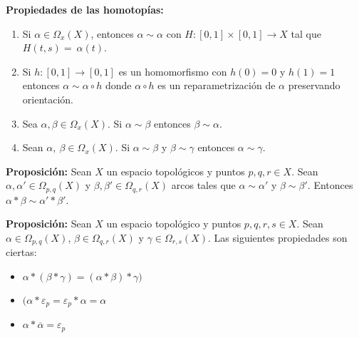 \documentclass{article}
\begin{document}
\textbf{Propiedades de las homotopías:}
\begin{enumerate}
\item Si $\alpha\in \Omega_x(X)$, entonces $\alpha\sim \alpha$ con $H:[0,1]\times [0,1]\rightarrow X$ tal que $H(t,s)=~\alpha(t)$.

\item Si $h:[0,1]\rightarrow [0,1]$ es un homomorfismo con $h(0)=0$ y $h(1)=1$ entonces $\alpha\sim \alpha\circ h$ donde $\alpha \circ h$ es un reparametrización de $\alpha$ preservando orientación.

\item Sea $\alpha,\beta \in \Omega_x(X)$. Si $\alpha\sim \beta$ entonces $\beta \sim \alpha$.

\item Sean $\alpha,\:\beta\in \Omega_x(X)$. Si $\alpha\sim \beta$ y $\beta\sim \gamma$ entonces $\alpha\sim \gamma$.
\end{enumerate}

\textbf{Proposición:} Sean $X$ un espacio topológicos y puntos $p,q,r\in X$. Sean $\alpha,\alpha'\in \Omega_{p,q}(X)$ y $\beta,\beta'\in \Omega_{q,r}(X)$ arcos tales que $\alpha\sim \alpha'$ y $\beta\sim \beta'$. Entonces $\alpha*\beta\sim \alpha'*\beta'$.

\textbf{Proposición:} Sean $X$ un espacio topológico y puntos $p,q,r,s\in X$. Sean $\alpha \in \Omega_{p,q}(X)$, $\beta\in \Omega_{q,r}(X)$ y $\gamma\in \Omega_{r,s}(X)$. Las siguientes propiedades son ciertas:

\begin{itemize}
\item $\alpha*(\beta*\gamma)=(\alpha*\beta)*\gamma)$

\item $(\alpha*\varepsilon_p=\varepsilon_p*\alpha=\alpha$

\item $	\alpha*\overline{\alpha} = \varepsilon_p$
\end{itemize}
\end{document}

